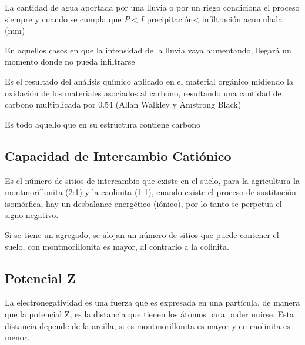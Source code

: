 La cantidad de agua aportada por una lluvia o por un riego condiciona el proceso siempre y cuando se cumpla que $P<I$ precipitación< infiltración acumulada (mm)

En aquellos casos en que la intensidad de la lluvia vaya aumentando, llegará un momento donde no pueda infiltrarse


  \begin{definition}
    Es el resultado del análisis químico aplicado en el material orgánico midiendo la oxidación de los materiales asociados al carbono, resultando una cantidad de carbono multiplicada por 0.54 (Allan Walkley y Amstrong Black)
  \end{definition}
  \begin{definition}
    Es todo aquello que en su estructura contiene carbono
  \end{definition}



\subsection{Capacidad de Intercambio Catiónico}
Es el número de sitios de intercambio que existe en el suelo, para la agricultura la montmorillonita (2:1) y la caolinita (1:1), cuando existe el proceso de sustitución isomórfica, hay un desbalance energético (iónico), por lo tanto se perpetua el signo negativo.

Si se tiene un agregado, se alojan un número de sitios que puede contener el suelo, con montmorillonita es mayor, al contrario a la colinita.
\subsection{Potencial Z}
La electronegatividad es una fuerza que es expresada en una partícula, de manera que la potencial Z, es la distancia que tienen los átomos para poder unirse. Esta distancia depende de la arcilla, si es montmorillonita es mayor y en caolinita es menor.

